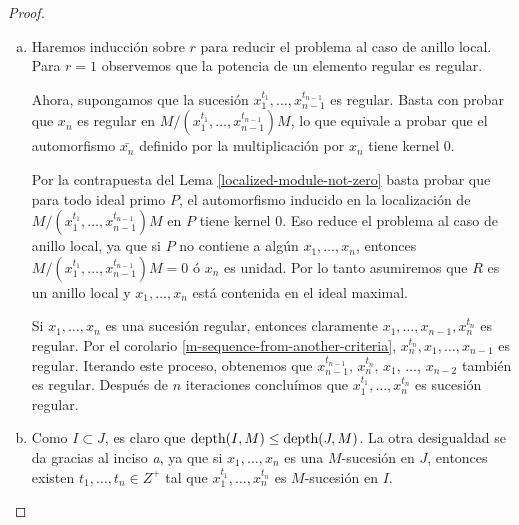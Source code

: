\begin{proof}
\begin{enumerate}[a.]
\item Haremos inducción sobre $r$ para reducir el problema al caso de anillo local. Para $r = 1$ observemos que la potencia de un elemento regular es regular.

Ahora, supongamos que la sucesión $x_1^{t_1},\dots,x_{n-1}^{t_{n-1}}$ es regular. Basta con probar que $x_n$ es regular en $M/(x_1^{t_1},\dots,x_{n-1}^{t_{n-1}})M$, lo que equivale a probar que el automorfismo $\bar{x_n}$ definido por la multiplicación por $x_n$ tiene kernel 0. 

Por la contrapuesta del Lema \ref{localized-module-not-zero} basta probar que para todo ideal primo $P$, el automorfismo inducido en la localización de $M/(x_1^{t_1},\dots,x_{n-1}^{t_{n-1}})M$ en $P$ tiene kernel 0. Eso reduce el problema al caso de anillo local, ya que si $P$ no contiene a algún $x_1,\dots,x_n$, entonces $M/(x_1^{t_1},\dots,x_{n-1}^{t_{n-1}})M = 0$ ó $x_n$ es unidad. Por lo tanto asumiremos que $R$ es un anillo local y $x_1,\dots,x_n$ está contenida en el ideal maximal.

Si $x_1,\dots,x_n$ es una sucesión regular, entonces claramente $x_1,\dots,x_{n-1},x_n^{t_n}$ es regular. Por el corolario \ref{m-sequence-from-another-criteria}, $x_n^{t_n},x_1,\dots,x_{n-1}$ es regular. Iterando este proceso, obtenemos que $x_{n-1}^{t_{n-1}}$, $x_n^{t_n}$, $x_1$, $\dots$, $x_{n-2}$ también es regular. Después de $n$ iteraciones concluímos que $x_1^{t_1},\dots,x_n^{t_n}$ es sucesión regular.

\item Como $I \subset J$, es claro que $\textrm{depth}(I,M) \leq \textrm{depth}(J,M)$. La otra desigualdad se da gracias al inciso \emph{a}, ya que si $x_1, \dots, x_n$ es una $M$-sucesión en $J$, entonces existen $t_1,\dots,t_n \in Z^+$ tal que $x_1^{t_1},\dots,x_n^{t_n}$ es $M$-sucesión en $I$.

\end{enumerate}
\end{proof}